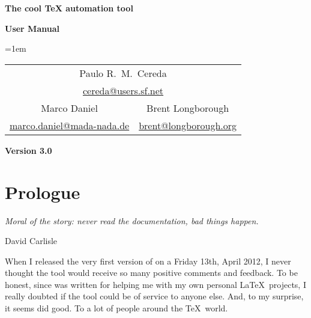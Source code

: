 \documentclass[a4paper,twoside,12pt]{memoir}
\newcommand{\araraversion}{3.0}
\begin{document}
\begin{titlingpage}

\begin{center}
\vspace*{2em}

\scalebox{1.15}{\araralogo}

\vspace{2em}

{\color{araracolor}\bfseries\Huge The cool \TeX{} automation tool}

\vspace{10em}

{\Huge\sffamily\bfseries User Manual}

\vspace{3em}

{\large
\tabcolsep=1em
\begin{tabular}{cc}
\multicolumn{2}{c}{Paulo R.\ M.\ Cereda}\\
\multicolumn{2}{c}{\url{cereda@users.sf.net}}\\[1.5em]
Marco Daniel & Brent Longborough\\
\url{marco.daniel@mada-nada.de} & \url{brent@longborough.org}
\end{tabular}}

\vfill

{\LARGE\sffamily\bfseries Version \araraversion}

\end{center}

\end{titlingpage}

\pagestyle{headings} 
\frontmatter
\nouppercaseheads

\chapter*{Prologue}
\label{chap:prologue}

\epigraph{\emph{Moral of the story: never read the documentation, bad things happen.}}{David Carlisle}

When I released the very first version of \arara on a Friday 13th, April 2012, I never thought the tool would receive so many positive comments and feedback. To be honest, since \arara was written for helping me with my own personal \LaTeX\ projects, I really doubted if the tool could be of service to anyone else. And, to my surprise, it seems \arara did good. To a lot of people around the \TeX\ world.
\end{document}
